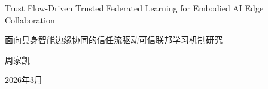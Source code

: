 \documentclass[11pt, a4paper, UTF8, fontset=fandol]{ctexart}
\begin{document}
\begin{center}
    {\Large Trust Flow-Driven Trusted Federated Learning for Embodied AI Edge Collaboration\par}
    \vspace{4pt}
    {\Large 面向具身智能边缘协同的信任流驱动可信联邦学习机制研究\par}
    \vspace{10pt}
    {周家凯\par}
    \vspace{2pt}
    {2026年3月\par}
\end{center}

\begin{abstract}
    随着物联网、边缘计算与大模型技术的持续演进，具身智能设备正在由孤立感知终端转变为能够在开放物理空间中持续交互、协同学习与自主决策的智能实体。该类设备通常部署于家庭服务、工业巡检、智能交通和移动机器人等场景，其本地采集的视觉、语音、运动轨迹与环境状态数据具有显著隐私敏感性，且不同设备在算力、传感器配置、任务目标和场景分布上存在强异构特征。因此，联邦学习凭借数据驻留本地与参数协同优化的优势，为具身智能边缘协同提供了可行的分布式训练范式。然而，具身智能网络的开放接入、动态在线、物理环境不可控和行为长期演化等特征，使传统联邦学习面临执行可信、潜伏投毒和强 Non-IID 泛化退化的复合挑战，现有鲁棒聚合方法难以同时满足安全防护、低误杀和稳定收敛需求。

    为解决上述问题，本文提出一种面向具身智能边缘协同的信任流驱动可信联邦学习机制。该机制从多维度、多层次角度刻画具身设备协同训练中的可信状态：在端侧维度，融合可信执行环境远程证明、运行特征熵分析与卡尔曼滤波，将一次性身份校验扩展为可随训练轮次演化的动态准入信任评估；在训练过程维度，针对具身设备长期参与不稳定、任务贡献差异大和短时异常突发等特点，构建正交双流信任状态演化模型，将设备信任状态解耦为基于贝叶斯后验推断的历史效用流与基于多探针最大响应的瞬时风险流；在聚合维度，引入纯净参考方向驱动的分层差异化聚合策略，根据网络层级安全敏感度执行风险门控、幸存者权重重归一化与自适应边界裁剪。

    基于 Flower 与 PyTorch 的多端点仿真实验表明，在强 Non-IID 与混合攻击并存的具身智能边缘协同设置下，本文机制能够维持全局模型的高精度收敛，将攻击成功率压制至接近随机猜测水平，并使诚实长尾设备的永久误杀率趋近于零。实验结果验证了该机制在开放、异构和高对抗具身智能协同网络中的鲁棒性、适用性与工程可部署性。
\end{abstract}
\end{document}
